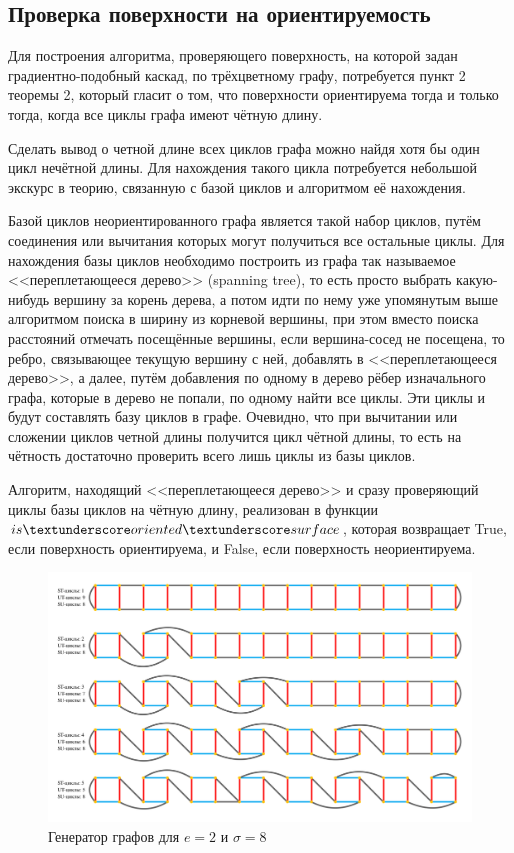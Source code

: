 	\subsection{Проверка поверхности на ориентируемость}
	\hspace{0.5 cm} Для построения алгоритма, проверяющего поверхность, на которой задан градиентно-подобный каскад, по трёхцветному графу, потребуется пункт 2 теоремы 2, который гласит о том, что поверхности ориентируема тогда и только тогда, когда все циклы графа имеют чётную длину.
	\par Сделать вывод о четной длине всех циклов графа можно найдя хотя бы один цикл нечётной длины. Для нахождения такого цикла потребуется небольшой экскурс в теорию, связанную с базой циклов и алгоритмом её нахождения.
	\par Базой циклов неориентированного графа является такой набор циклов, путём соединения или вычитания которых могут получиться все остальные циклы. Для нахождения базы циклов необходимо построить из графа так называемое <<переплетающееся дерево>> (spanning tree), то есть просто выбрать какую-нибудь вершину за корень дерева, а потом идти по нему уже упомянутым выше алгоритмом поиска в ширину из корневой вершины, при этом вместо поиска расстояний отмечать посещённые вершины, если вершина-сосед не посещена, то ребро, связывающее текущую вершину с ней, добавлять в <<переплетающееся дерево>>, а далее, путём добавления по одному в дерево рёбер изначального графа, которые в дерево не попали, по одному найти все циклы. Эти циклы и будут составлять базу циклов в графе. Очевидно, что при вычитании или сложении циклов четной длины получится цикл чётной длины, то есть на чётность достаточно проверить всего лишь циклы из базы циклов.
	\par Алгоритм, находящий <<переплетающееся дерево>> и сразу проверяющий циклы базы циклов на чётную длину, реализован в функции $is \textunderscore oriented \textunderscore surface$, которая возвращает True, если поверхность ориентируема, и False, если поверхность неориентируема.
	\begin{figure}[h!]
		\centering
		\includegraphics[width=\textwidth]{Spheres.png}
		\caption{Генератор графов для $e=2$ и $\sigma=8$ \label{overflow}}
	\end{figure}
